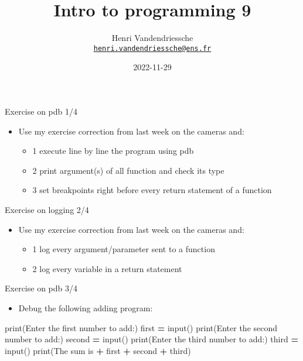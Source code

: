 \documentclass[
  8pt,
  ignorenonframetext,
]{beamer}
\title{Intro to programming 9}
\author{Henri Vandendriessche\\
\href{mailto:henri.vandendriessche@ens.fr}{\nolinkurl{henri.vandendriessche@ens.fr}}}
\date{2022-11-29}
\newenvironment{Shaded}{\begin{snugshade}}{\end{snugshade}}
\newcommand{\BuiltInTok}[1]{#1}
\newcommand{\NormalTok}[1]{#1}
\newcommand{\OperatorTok}[1]{\textcolor[rgb]{0.81,0.36,0.00}{\textbf{#1}}}
\newcommand{\StringTok}[1]{\textcolor[rgb]{0.31,0.60,0.02}{#1}}
\providecommand{\tightlist}{%
  \setlength{\itemsep}{0pt}\setlength{\parskip}{0pt}}
\begin{document}
\frame{\titlepage}

\begin{frame}{Exercise on pdb 1/4}
\protect\hypertarget{exercise-on-pdb-14}{}
\begin{itemize}
\tightlist
\item
  Use my exercise correction from last week on the cameras and:

  \begin{itemize}
  \tightlist
  \item
    1 execute line by line the program using pdb
  \item
    2 print argument(s) of all function and check its type
  \item
    3 set breakpoints right before every return statement of a function
  \end{itemize}
\end{itemize}
\end{frame}

\begin{frame}{Exercise on logging 2/4}
\protect\hypertarget{exercise-on-logging-24}{}
\begin{itemize}
\tightlist
\item
  Use my exercise correction from last week on the cameras and:

  \begin{itemize}
  \tightlist
  \item
    1 log every argument/parameter sent to a function
  \item
    2 log every variable in a return statement
  \end{itemize}
\end{itemize}
\end{frame}

\begin{frame}[fragile]{Exercise on pdb 3/4}
\protect\hypertarget{exercise-on-pdb-34}{}
\begin{itemize}
\tightlist
\item
  Debug the following adding program:
\end{itemize}

\begin{Shaded}
\begin{Highlighting}[]
\BuiltInTok{print}\NormalTok{(}\StringTok{\textquotesingle{}Enter the first number to add:\textquotesingle{}}\NormalTok{)}
\NormalTok{first }\OperatorTok{=} \BuiltInTok{input}\NormalTok{()}
\BuiltInTok{print}\NormalTok{(}\StringTok{\textquotesingle{}Enter the second number to add:\textquotesingle{}}\NormalTok{)}
\NormalTok{second }\OperatorTok{=} \BuiltInTok{input}\NormalTok{()}
\BuiltInTok{print}\NormalTok{(}\StringTok{\textquotesingle{}Enter the third number to add:\textquotesingle{}}\NormalTok{)}
\NormalTok{third }\OperatorTok{=} \BuiltInTok{input}\NormalTok{()}
\BuiltInTok{print}\NormalTok{(}\StringTok{\textquotesingle{}The sum is \textquotesingle{}} \OperatorTok{+}\NormalTok{ first }\OperatorTok{+}\NormalTok{ second }\OperatorTok{+}\NormalTok{ third)}
\end{Highlighting}
\end{Shaded}
\end{frame}
\end{document}
